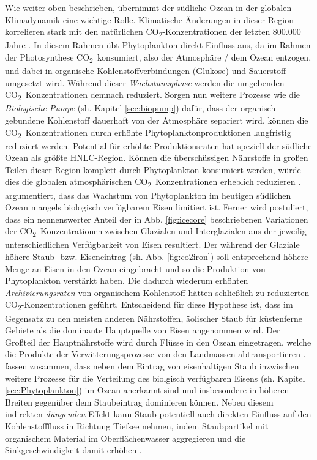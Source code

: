 \documentclass[12pt,a4paper,onecolumn]{scrartcl}
\newcommand{\cotwo}{CO\textsubscript{2}}
\begin{document}
Wie weiter oben beschrieben, übernimmt der südliche Ozean in der globalen Klimadynamik eine wichtige Rolle. Klimatische Änderungen in dieser Region korrelieren stark mit den natürlichen \cotwo -Konzentrationen der letzten 800.000 Jahre \citep{Fischer.2010}. In diesem Rahmen übt Phytoplankton direkt Einfluss aus, da im Rahmen der Photosynthese \cotwo \ konsumiert, also der Atmosphäre / dem Ozean entzogen, und dabei in organische Kohlenstoffverbindungen (Glukose) und Sauerstoff umgesetzt wird. Während dieser \textit{Wachstumsphase} werden die umgebenden \cotwo \ Konzentrationen demnach reduziert. Sorgen nun weitere Prozesse wie die \textit{Biologische Pumpe} (sh. Kapitel \ref{sec:biopump}) dafür, dass der organisch gebundene Kohlenstoff dauerhaft von der Atmosphäre separiert wird, können die \cotwo \ Konzentrationen durch erhöhte Phytoplanktonproduktionen langfristig reduziert werden. Potential für erhöhte Produktionsraten hat speziell der südliche Ozean als größte HNLC-Region. Können die überschüssigen Nährstoffe in großen Teilen dieser Region komplett durch Phytoplankton konsumiert werden, würde dies die globalen atmosphärischen \cotwo \ Konzentrationen erheblich reduzieren \citep{Martin.1990}. \citet{Martin.1990} argumentiert, dass das Wachstum von Phytoplankton im heutigen südlichen Ozean mangels biologisch verfügbarem Eisen limitiert ist. Ferner wird postuliert, dass ein nennenswerter Anteil der in Abb. \ref{fig:icecore} beschriebenen Variationen der \cotwo \ Konzentrationen zwischen Glazialen und Interglazialen aus der jeweilig unterschiedlichen Verfügbarkeit von Eisen resultiert. Der während der Glaziale höhere Staub- bzw. Eiseneintrag (sh. Abb. \ref{fig:co2iron}) soll entsprechend höhere Menge an Eisen in den Ozean eingebracht und so die Produktion von Phytoplankton verstärkt haben. Die dadurch wiederum erhöhten \textit{Archivierungsraten} von organischem Kohlenstoff hätten schließlich zu reduzierten \cotwo-Konzentrationen geführt. Entscheidend für diese Hypothese ist, dass im Gegensatz zu den meisten anderen Nährstoffen, äolischer Staub für küstenferne Gebiete als die dominante Hauptquelle von Eisen angenommen wird. Der Großteil der Hauptnährstoffe wird durch Flüsse in den Ozean eingetragen, welche die Produkte der Verwitterungsprozesse von den Landmassen abtransportieren \citep{Emerson.2009}. \citet{Tagliabue.2017} fassen zusammen, dass neben dem Eintrag von eisenhaltigen Staub inzwischen weitere Prozesse für die Verteilung des biolgisch verfügbaren Eisens (sh. Kapitel \ref{sec:Phytoplankton}) im Ozean anerkannt sind und insbesondere in höheren Breiten gegenüber dem Staubeintrag dominieren können. Neben diesem indirekten \textit{düngenden} Effekt kann Staub potentiell auch direkten Einfluss auf den Kohlenstofffluss in Richtung Tiefsee nehmen, indem Staubpartikel mit organischem Material im Oberflächenwasser aggregieren und die Sinkgeschwindigkeit damit  erhöhen \citep{vanderJagt.2018} . \\
\end{document}
